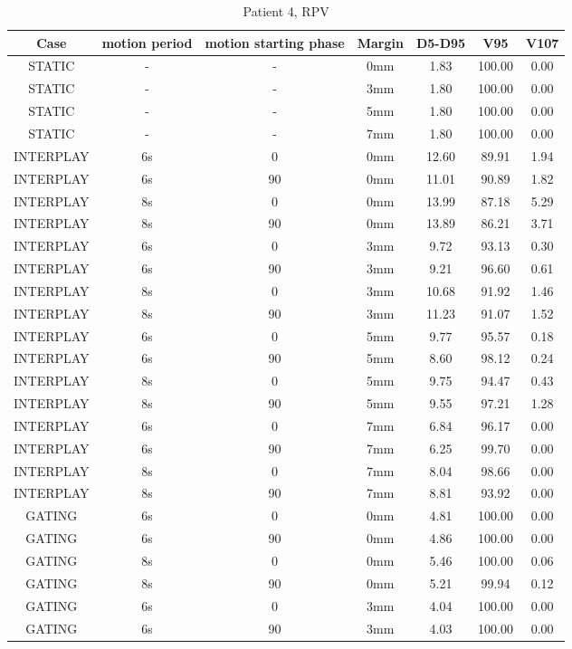 \begin{table}[H]
  \centering
  \caption{Patient 4, RPV}
  \begin{tabular}{|c||c|c|c||c|c|c|}
    \hline\hline
    Case & motion period & motion starting phase & Margin & D5-D95 & V95 & V107\\
    \hline 
STATIC & - & - & 0mm & 1.83 & 100.00 & 0.00 \\
STATIC & - & - & 3mm & 1.80 & 100.00 & 0.00 \\
STATIC & - & - & 5mm & 1.80 & 100.00 & 0.00 \\
STATIC & - & - & 7mm & 1.80 & 100.00 & 0.00 \\
INTERPLAY & 6s & 0 & 0mm & 12.60 & 89.91 & 1.94 \\
INTERPLAY & 6s & 90 & 0mm & 11.01 & 90.89 & 1.82 \\
INTERPLAY & 8s & 0 & 0mm & 13.99 & 87.18 & 5.29 \\
INTERPLAY & 8s & 90 & 0mm & 13.89 & 86.21 & 3.71 \\
INTERPLAY & 6s & 0 & 3mm & 9.72 & 93.13 & 0.30 \\
INTERPLAY & 6s & 90 & 3mm & 9.21 & 96.60 & 0.61 \\
INTERPLAY & 8s & 0 & 3mm & 10.68 & 91.92 & 1.46 \\
INTERPLAY & 8s & 90 & 3mm & 11.23 & 91.07 & 1.52 \\
INTERPLAY & 6s & 0 & 5mm & 9.77 & 95.57 & 0.18 \\
INTERPLAY & 6s & 90 & 5mm & 8.60 & 98.12 & 0.24 \\
INTERPLAY & 8s & 0 & 5mm & 9.75 & 94.47 & 0.43 \\
INTERPLAY & 8s & 90 & 5mm & 9.55 & 97.21 & 1.28 \\
INTERPLAY & 6s & 0 & 7mm & 6.84 & 96.17 & 0.00 \\
INTERPLAY & 6s & 90 & 7mm & 6.25 & 99.70 & 0.00 \\
INTERPLAY & 8s & 0 & 7mm & 8.04 & 98.66 & 0.00 \\
INTERPLAY & 8s & 90 & 7mm & 8.81 & 93.92 & 0.00 \\
GATING & 6s & 0 & 0mm & 4.81 & 100.00 & 0.00 \\
GATING & 6s & 90 & 0mm & 4.86 & 100.00 & 0.00 \\
GATING & 8s & 0 & 0mm & 5.46 & 100.00 & 0.06 \\
GATING & 8s & 90 & 0mm & 5.21 & 99.94 & 0.12 \\
GATING & 6s & 0 & 3mm & 4.04 & 100.00 & 0.00 \\
GATING & 6s & 90 & 3mm & 4.03 & 100.00 & 0.00 \\

\end{tabular}
\end{table}
